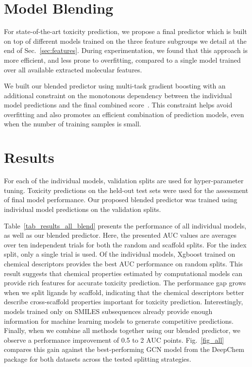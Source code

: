 \documentclass[11pt,a4paper]{article}
\begin{document}
\section{Model Blending}\label{sec:blend}

For state-of-the-art toxicity prediction, we propose a final predictor which
is built on top of different models trained on the three feature subgroups we detail
at the end of Sec.~\ref{sec:features}. During experimentation, we found that 
this approach is more efficient, and less prone to overfitting,
compared to a single model trained over all available extracted molecular features.

We built our blended predictor using  multi-task gradient boosting
with an additional constraint on the monotonous dependency between the individual
model predictions and the final combined score~\cite{Ridgeway:2007aa}. 
This constraint helps avoid overfitting and also promotes an efficient 
combination of prediction models, even when the number of training samples is small.

\section{Results}\label{sec:results}
For each of the individual models, validation splits are used for hyper-parameter tuning.
Toxicity predictions on the held-out test sets were used for the assessment of final
model performance.
Our proposed blended predictor was trained using individual model predictions on
the validation splits.               

Table~\ref{tab_results_all_blend} presents the performance of all individual models, as
well as our blended predictor. Here, the presented AUC values are averages over ten
independent trials for both the random and scaffold splits. For the index split, only
a single trial is used. 
Of the individual models, Xgboost trained on chemical descriptors provides the best 
AUC performance on random splits.
This result suggests that chemical properties estimated by computational models
can provide rich features for accurate toxicity prediction.
The performance gap grows when we split ligands by scaffold, indicating that the
chemical descriptors better describe cross-scaffold properties important for toxicity
prediction. Interestingly, models trained only on SMILES subsequences already provide 
enough information for machine learning models to generate competitive predictions. 
Finally, when we combine all methods together using our blended predictor, 
we observe a performance improvement of  0.5 to 2 AUC points.  Fig.~\ref{fig_all} 
compares this gain against the best-performing GCN model 
from the DeepChem package \cite{Wu:2017} for both datasets across the 
tested splitting strategies.
\end{document}
